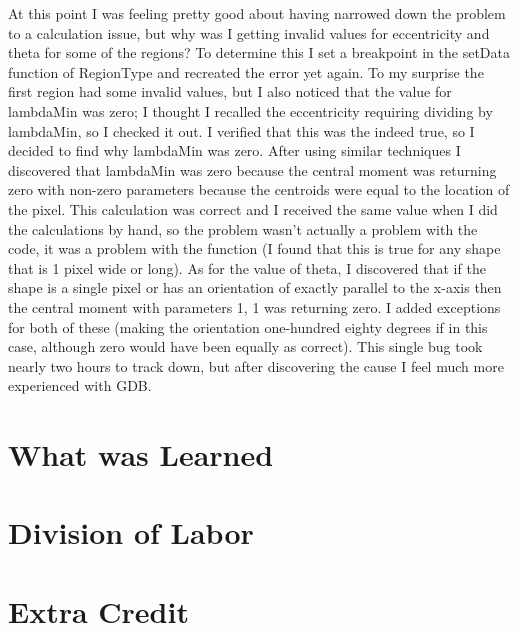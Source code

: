 \documentclass[pdftex, 11pt]{article}
\begin{document}
At this point I was feeling pretty good about having narrowed down the problem to a calculation issue, but why was I
getting invalid values for eccentricity and theta for some of the regions?  To determine this I set a breakpoint in the
setData function of RegionType and recreated the error yet again.  To my surprise the first region had some invalid
values, but I also noticed that the value for lambdaMin was zero; I thought I recalled the eccentricity requiring
dividing by lambdaMin, so I checked it out.  I verified that this was the indeed true, so I decided to find why
lambdaMin was zero.  After using similar techniques I discovered that lambdaMin was zero because the central moment was
returning zero with non-zero parameters because the centroids were equal to the location of the pixel.  This calculation
was correct and I received the same value when I did the calculations by hand, so the problem wasn't actually a problem
with the code, it was a problem with the function (I found that this is true for any shape that is 1 pixel wide or
long).  As for the value of theta, I discovered that if the shape is a single pixel or has an orientation of exactly
parallel to the x-axis then the central moment with parameters 1, 1 was returning zero.  I added exceptions for both of
these (making the orientation one-hundred eighty degrees if in this case, although zero would have been equally as
correct).  This single bug took nearly two hours to track down, but after discovering the cause I feel much more
experienced with GDB.



\section{What was Learned}

\section{Division of Labor}

\section{Extra Credit}
\end{document}
